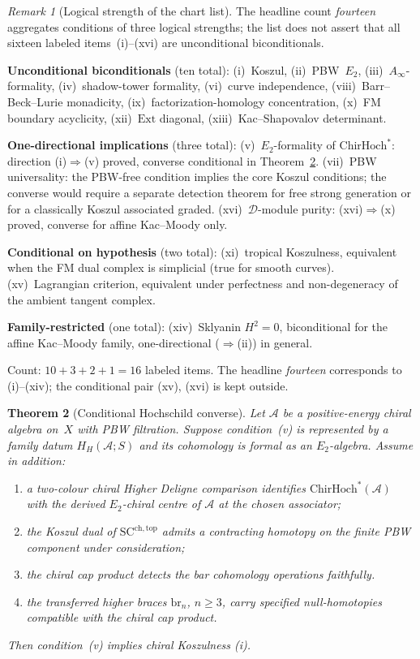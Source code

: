 \documentclass[11pt,reqno]{amsart}
\newtheorem{theorem}{Theorem}[section]
\theoremstyle{definition}
\theoremstyle{remark}
\newtheorem{remark}[theorem]{Remark}
\newcommand{\cA}{\mathcal{A}}
\newcommand{\cD}{\mathcal{D}}
\newcommand{\Ext}{\mathrm{Ext}}
\newcommand{\ChirHoch}{\mathrm{ChirHoch}}
\newcommand{\Etwo}{E_2}
\newcommand{\SCchtop}{\mathrm{SC}^{\mathrm{ch,top}}}
\newcommand{\Ainfty}{A_\infty}
\numberwithin{equation}{section}
\begin{document}
\begin{remark}[Logical strength of the chart list]
\label{rem:fourteen-characterizations-strength}
The headline count \emph{fourteen} aggregates conditions of three
logical strengths; the list does not assert that all sixteen
labeled items~(i)--(xvi) are unconditional biconditionals.

\textbf{Unconditional biconditionals} (ten total):
(i)~Koszul, (ii)~PBW~$\Etwo$, (iii)~$\Ainfty$-formality,
(iv)~shadow-tower formality, (vi)~curve independence,
(viii)~Barr--Beck--Lurie monadicity,
(ix)~factorization-homology concentration,
(x)~FM boundary acyclicity, (xii)~$\Ext$ diagonal,
(xiii)~Kac--Shapovalov determinant.

\textbf{One-directional implications} (three total):
(v)~$\Etwo$-formality of $\ChirHoch^*$: direction
(i)$\Rightarrow$(v) proved, converse conditional in
Theorem~\ref{thm:kfc-v-converse}.
(vii)~PBW universality: the PBW-free condition implies the core
Koszul conditions; the converse would require a separate
detection theorem for free strong generation or for a
classically Koszul associated graded.
(xvi)~$\cD$-module purity: (xvi)$\Rightarrow$(x) proved,
converse for affine Kac--Moody only.

\textbf{Conditional on hypothesis} (two total):
(xi)~tropical Koszulness, equivalent when the FM dual complex
is simplicial (true for smooth curves).
(xv)~Lagrangian criterion, equivalent under perfectness and
non-degeneracy of the ambient tangent complex.

\textbf{Family-restricted} (one total):
(xiv)~Sklyanin $H^2 = 0$, biconditional for the affine
Kac--Moody family, one-directional ($\Rightarrow$(ii)) in
general.

Count: $10 + 3 + 2 + 1 = 16$ labeled items. The headline
\emph{fourteen} corresponds to (i)--(xiv); the conditional
pair (xv), (xvi) is kept outside.
\end{remark}

\begin{theorem}[Conditional Hochschild converse]
\label{thm:kfc-v-converse}
Let $\cA$ be a positive-energy chiral algebra on~$X$ with PBW
filtration. Suppose condition~(v) is represented by a family datum
$H_H(\cA;S)$ and its cohomology is formal as an $\Etwo$-algebra.
Assume in addition:
\begin{enumerate}[label=\textup{(\alph*)}]
\item a two-colour chiral Higher Deligne comparison identifies
  $\ChirHoch^*(\cA)$ with the derived $\Etwo$-chiral centre of
  $\cA$ at the chosen associator;
\item the Koszul dual of \(\SCchtop\) admits a contracting
  homotopy on the finite PBW component under consideration;
\item the chiral cap product detects the bar cohomology
  operations faithfully.
\item the transferred higher braces $\mathrm{br}_n$, $n\geq3$,
  carry specified null-homotopies compatible with the chiral cap
  product.
\end{enumerate}
Then condition~\textup{(v)} implies chiral Koszulness
\textup{(i)}.
\end{theorem}
\end{document}

